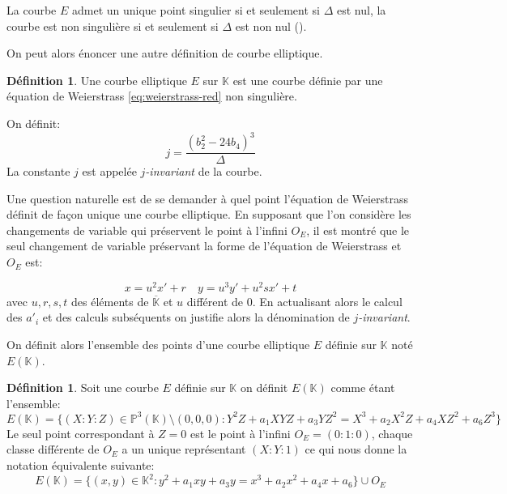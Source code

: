\documentclass[10pt,a4paper]{book}
\theoremstyle{plain}
\theoremstyle{definition}
\theoremstyle{definition}
\theoremstyle{definition}
\theoremstyle{definition}
\newtheorem{defi}[thm]{Définition}
\theoremstyle{remark}
\theoremstyle{remark}
\begin{document}
La courbe $E$ admet un unique point singulier si et seulement si $\Delta$ est nul, la courbe est non singulière si et seulement si $\Delta$ est non nul (\cite[Prop. III.1.4]{Silv1}).

On peut alors énoncer une autre définition de courbe elliptique.

\begin{defi}
Une courbe elliptique $E$ sur $\mathbb{K}$ est une courbe définie par une équation de Weierstrass \ref{eq:weierstrass-red} non singulière.
\end{defi}

On définit: 
\begin{equation*}
j=\frac{(b_2^2-24b_4)^3}{\Delta}
\end{equation*}
La constante $j$ est appelée \emph{$j$-invariant} de la courbe.

Une question naturelle est de se demander à quel point l'équation de Weierstrass définit de façon unique une courbe elliptique. En supposant que l'on considère les changements de variable qui préservent le point à l'infini $O_E$, il est montré \cite[III.3.1b]{Silv1} que le seul changement de variable préservant la forme de l'équation de Weierstrass et $O_E$ est:

\begin{equation*}
x=u^2x'+r    \quad  y=u^3y'+u^2sx'+t
\end{equation*}
avec $u,r,s,t$ des éléments de $\overline{\mathbb{K}}$ et $u$ différent de $0$. En actualisant alors le calcul des $a'_i$ et des calculs subséquents on justifie alors la dénomination de \emph{$j$-invariant}.
\newline


On définit alors l'ensemble des points d'une courbe elliptique $E$ définie sur $\mathbb{K}$  noté $E(\mathbb{K})$.

\begin{defi}
Soit une courbe $E$ définie sur $\mathbb{K}$ on définit $E(\mathbb{K})$ comme étant l'ensemble:
\begin{equation*}
E(\mathbb{K})=\{(X:Y:Z)\in \mathbb{P}^3(\mathbb{K}) \setminus (0,0,0) : Y^2Z+a_1XYZ+a_3YZ^2=X^3+a_2X^2Z+a_4XZ^2+a_6Z^3 \}
\end{equation*}
Le seul point correspondant à $Z=0$ est le point à l'infini $O_E=(0:1:0)$, chaque classe différente de $O_E$ a un unique représentant $(X:Y:1)$ ce qui nous donne la notation équivalente suivante:
\begin{equation*}
E(\mathbb{K})=\{(x,y)\in \mathbb{K}^2  : y^2+a_1xy+a_3y=x^3+a_2x^2+a_4x+a_6 \} \cup {O_E}
\end{equation*}
\end{defi}
\end{document}
